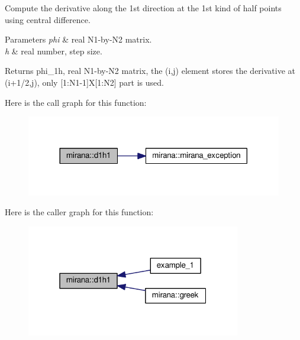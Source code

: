 Compute the derivative along the 1st direction at the 1st kind of half points using central difference. 


\begin{DoxyParams}{Parameters}
{\em phi} & real N1-\/by-\/\+N2 matrix. \\
\hline
{\em h} & real number, step size. \\
\hline
\end{DoxyParams}
\begin{DoxyReturn}{Returns}
phi\+\_\+1h, real N1-\/by-\/\+N2 matrix, the (i,j) element stores the derivative at (i+1/2,j), only \mbox{[}1\+:N1-\/1\mbox{]}X\mbox{[}1\+:N2\mbox{]} part is used. 
\end{DoxyReturn}


Here is the call graph for this function\+:\nopagebreak
\begin{figure}[H]
\begin{center}
\leavevmode
\includegraphics[width=317pt]{namespacemirana_acc84c99770972f6328e89ac04ac67153_cgraph}
\end{center}
\end{figure}




Here is the caller graph for this function\+:\nopagebreak
\begin{figure}[H]
\begin{center}
\leavevmode
\includegraphics[width=265pt]{namespacemirana_acc84c99770972f6328e89ac04ac67153_icgraph}
\end{center}
\end{figure}


\hypertarget{namespacemirana_a9d6168761271912ebfea872e9f322cdc}{}
